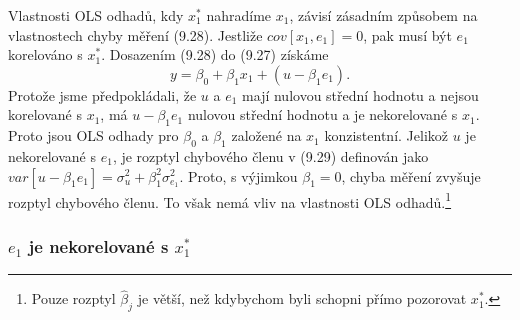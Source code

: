Vlastnosti OLS odhadů, kdy $x_1^*$ nahradíme $x_1$, závisí zásadním způsobem na vlastnostech chyby měření (9.28). Jestliže $cov[x_1, e_1] = 0$, pak musí být $e_1$ korelováno s $x_1^*$. Dosazením (9.28) do (9.27) získáme
\begin{equation}
y = \beta_0 + \beta_1 x_1 + (u - \beta_1 e_1).
\end{equation}
Protože jsme předpokládali, že $u$ a $e_1$ mají nulovou střední hodnotu a nejsou korelované s $x_1$, má $u - \beta_1 e_1$ nulovou střední hodnotu a je nekorelované s $x_1$. Proto jsou OLS odhady pro $\beta_0$ a $\beta_1$ založené na $x_1$ konzistentní. Jelikož $u$ je nekorelované s $e_1$, je rozptyl chybového členu v (9.29) definován jako $var[u - \beta_1 e_1] = \sigma_u^2 + \beta_1^2 \sigma_{e_1}^2$. Proto, s výjimkou $\beta_1 = 0$, chyba měření zvyšuje rozptyl chybového členu. To však nemá vliv na vlastnosti OLS odhadů.\footnote{Pouze rozptyl $\hat{\beta}_j$ je větší, než kdybychom byli schopni přímo pozorovat $x_1^*$.}

\subsubsection{$e_1$ je nekorelované s $x_1^*$}

